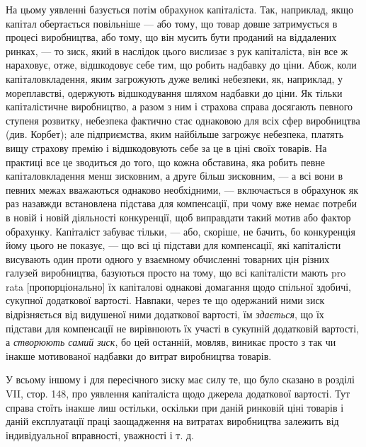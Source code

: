 На цьому уявленні базується потім обрахунок капіталіста.
Так, наприклад, якщо капітал обертається повільніше — або тому,
що товар довше затримується в процесі виробництва, або тому,
що він мусить бути проданий на віддалених ринках, — то зиск,
який в наслідок цього вислизає з рук капіталіста, він все ж нараховує,
отже, відшкодовує себе тим, що робить надбавку до
ціни. Абож, коли капіталовкладення, яким загрожують дуже
великі небезпеки, як, наприклад, у мореплавстві, одержують відшкодування
шляхом надбавки до ціни. Як тільки капіталістичне
виробництво, а разом з ним і страхова справа досягають певного
ступеня розвитку, небезпека фактично стає однаковою для
всіх сфер виробництва (див. Корбет); але підприємства, яким
найбільше загрожує небезпека, платять вищу страхову премію
і відшкодовують себе за це в ціні своїх товарів. На практиці
все це зводиться до того, що кожна обставина, яка робить
певне капіталовкладення менш зисковним, а друге більш зисковним,
— а всі вони в певних межах вважаються однаково необхідними,
— включається в обрахунок як раз назавжди встановлена
підстава для компенсації, при чому вже немає потреби в новій
і новій діяльності конкуренції, щоб виправдати такий мотив або
фактор обрахунку. Капіталіст забуває тільки, — або, скоріше,
не бачить, бо конкуренція йому цього не показує, — що всі ці
підстави для компенсації, які капіталісти висувають один проти
одного у взаємному обчисленні товарних цін різних галузей
виробництва, базуються просто на тому, що всі капіталісти мають
pro rata [пропорціонально] їх капіталові однакові домагання
щодо спільної здобичі, сукупної додаткової вартості. Навпаки,
через те що одержаний ними зиск відрізняється від видушеної
ними додаткової вартості, їм \emph{здається}, що їх підстави для
компенсації не вирівнюють їх участі в сукупній додатковій
вартості, а \emph{створюють самий зиск}, бо цей останній, мовляв,
виникає просто з так чи інакше мотивованої надбавки до витрат
виробництва товарів.

У всьому іншому і для пересічного зиску має силу те, що
було сказано в розділі VII, стор. 148, про уявлення капіталіста
щодо джерела додаткової вартості. Тут справа стоїть інакше
лиш остільки, оскільки при даній ринковій ціні товарів і даній
експлуатації праці заощадження на витратах виробництва залежить
від індивідуальної вправності, уважності і т. д.
